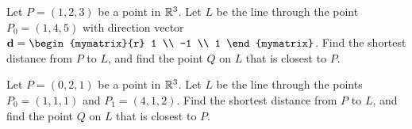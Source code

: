 \begin{enumialphparenastyle}

\begin{ex} Let $P = (1,2,3)$ be a point in $\mathbb{R}^3$. Let $L$ be the line through the point $P_0 = (1, 4, 5)$ with direction vector $\vect{d} = \begin{mymatrix}{r}
1 \\
-1 \\
1
\end{mymatrix}$. Find the shortest distance from $P$ to $L$, and find the point $Q$ on $L$ that is closest to $P$. 
\end{ex}

\begin{ex} Let $P = (0,2,1)$ be a point in $\mathbb{R}^3$. Let $L$ be the line through the points $P_0 = (1, 1, 1)$ and $P_1 = (4, 1, 2)$. Find the shortest distance from $P$ to $L$, and find the point $Q$ on $L$ that is closest to $P$. 
\end{ex}



\end{enumialphparenastyle}
